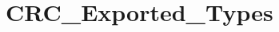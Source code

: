 \hypertarget{group___c_r_c___exported___types}{}\section{C\+R\+C\+\_\+\+Exported\+\_\+\+Types}
\label{group___c_r_c___exported___types}
